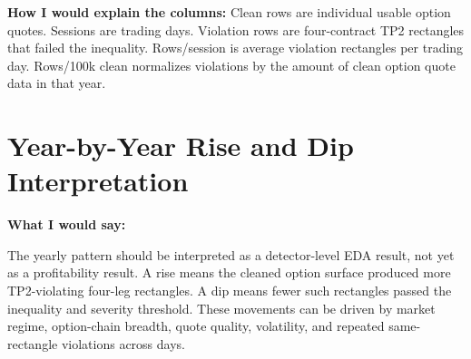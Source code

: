\documentclass[11pt]{article}
\begin{document}
\textbf{How I would explain the columns:}
Clean rows are individual usable option quotes. Sessions are trading days.
Violation rows are four-contract TP2 rectangles that failed the inequality.
Rows/session is average violation rectangles per trading day. Rows/100k clean
normalizes violations by the amount of clean option quote data in that year.

\section*{Year-by-Year Rise and Dip Interpretation}

\textbf{What I would say:}

The yearly pattern should be interpreted as a detector-level EDA result, not
yet as a profitability result. A rise means the cleaned option surface produced
more TP2-violating four-leg rectangles. A dip means fewer such rectangles
passed the inequality and severity threshold. These movements can be driven by
market regime, option-chain breadth, quote quality, volatility, and repeated
same-rectangle violations across days.
\end{document}
